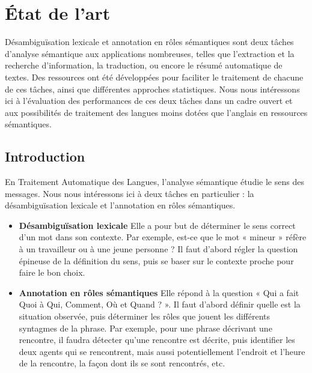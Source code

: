 \chapter{État de l'art} 
\label{ch:etatdelart} 

Désambiguïsation lexicale et annotation en rôles sémantiques sont deux tâches d'analyse sémantique aux applications nombreuses, telles que l'extraction et la recherche d'information, la traduction, ou encore le résumé automatique de textes. Des ressources ont été développées pour faciliter le traitement de chacune de ces tâches, ainsi que différentes approches statistiques. Nous nous intéressons ici à l'évaluation des performances de ces deux tâches dans un cadre ouvert et aux possibilités de traitement des langues moins dotées que l'anglais en ressources sémantiques.


\section{Introduction}

En Traitement Automatique des Langues, l'analyse sémantique étudie le sens des messages. Nous nous intéressons ici à deux tâches en particulier : la désambiguïsation lexicale et l'annotation en rôles sémantiques.

\begin{itemize}
  \item \textbf{Désambiguïsation lexicale} Elle a pour but de déterminer le sens correct d'un mot dans son contexte. Par exemple, est-ce que le mot « mineur » réfère à un travailleur ou à une jeune personne ? Il faut d'abord régler la question épineuse de la définition du sens, puis se baser sur le contexte proche pour faire le bon choix.
  \item \textbf{Annotation en rôles sémantiques} Elle répond à la question « Qui a fait Quoi à Qui, Comment, Où et Quand ? ». Il faut d'abord définir quelle est la situation observée, puis déterminer les rôles que jouent les différents syntagmes de la phrase. Par exemple, pour une phrase décrivant une rencontre, il faudra détecter qu'une rencontre est décrite, puis identifier les deux agents qui se rencontrent, mais aussi potentiellement l'endroit et l'heure de la rencontre, la façon dont ils se sont rencontrés, etc.
\end{itemize}

